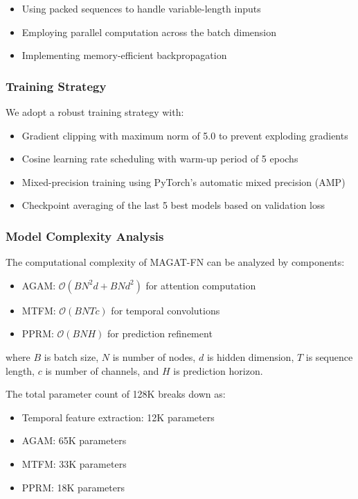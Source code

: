 \documentclass[lettersize, journal]{IEEEtran}
\begin{document}
\begin{itemize}
    \item Using packed sequences to handle variable-length inputs
    \item Employing parallel computation across the batch dimension
    \item Implementing memory-efficient backpropagation
\end{itemize}

\subsubsection{Training Strategy}
We adopt a robust training strategy with:

\begin{itemize}
    \item Gradient clipping with maximum norm of 5.0 to prevent exploding gradients
    \item Cosine learning rate scheduling with warm-up period of 5 epochs
    \item Mixed-precision training using PyTorch's automatic mixed precision (AMP)
    \item Checkpoint averaging of the last 5 best models based on validation loss
\end{itemize}

\subsubsection{Model Complexity Analysis}
The computational complexity of MAGAT-FN can be analyzed by components:

\begin{itemize}
    \item AGAM: $\mathcal{O}(BN^2d + BNd^2)$ for attention computation
    \item MTFM: $\mathcal{O}(BNTc)$ for temporal convolutions
    \item PPRM: $\mathcal{O}(BNH)$ for prediction refinement
\end{itemize}

where $B$ is batch size, $N$ is number of nodes, $d$ is hidden dimension, $T$ is sequence length, $c$ is number of channels, and $H$ is prediction horizon.

The total parameter count of 128K breaks down as:
\begin{itemize}
    \item Temporal feature extraction: 12K parameters
    \item AGAM: 65K parameters
    \item MTFM: 33K parameters
    \item PPRM: 18K parameters
\end{itemize}
\end{document}
